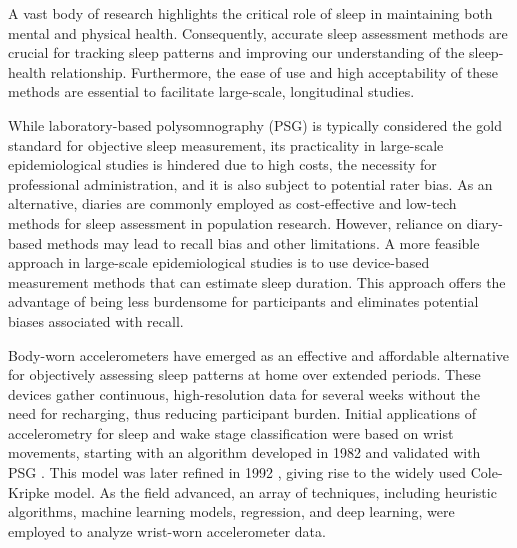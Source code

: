 \documentclass[
  super,
  preprint,
  3p]{elsarticle}
\begin{document}
A vast body of research highlights the critical role of sleep in
maintaining both mental and physical
health\citep{ma2017, meyer2022, kpavlova2019, difrancesco2019}.
Consequently, accurate sleep assessment methods are crucial for tracking
sleep patterns and improving our understanding of the sleep-health
relationship. Furthermore, the ease of use and high acceptability of
these methods are essential to facilitate large-scale, longitudinal
studies.

While laboratory-based polysomnography (PSG) is typically considered the
gold standard for objective sleep measurement, its practicality in
large-scale epidemiological studies is hindered due to high costs, the
necessity for professional administration, and it is also subject to
potential rater bias\citep{vandewater2011, lee2022}. As an alternative,
diaries are commonly employed as cost-effective and low-tech methods for
sleep assessment in population research. However, reliance on
diary-based methods may lead to recall bias and other
limitations\citep{moore2015}. A more feasible approach in large-scale
epidemiological studies is to use device-based measurement methods that
can estimate sleep duration. This approach offers the advantage of being
less burdensome for participants and eliminates potential biases
associated with recall.

Body-worn accelerometers have emerged as an effective and affordable
alternative for objectively assessing sleep patterns at home over
extended periods. These devices gather continuous, high-resolution data
for several weeks without the need for recharging, thus reducing
participant burden. Initial applications of accelerometry for sleep and
wake stage classification were based on wrist movements, starting with
an algorithm developed in 1982 and validated with PSG
\citep{webster1982}. This model was later refined in 1992
\citep{cole1992}, giving rise to the widely used Cole-Kripke model. As
the field advanced, an array of techniques, including heuristic
algorithms, machine learning models, regression, and deep learning, were
employed to analyze wrist-worn accelerometer
data\citep{palotti2019, cole1992, sazonov2004, sadeh1994, hees2015, sundararajan2021}.
\end{document}
